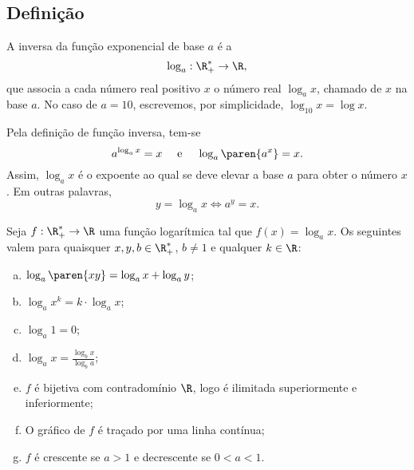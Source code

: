 \subsection{Definição}

\begin{definition}
A inversa da função exponencial de base $a$ é a 
$$\log_a : \R_+^* \to \R,$$
que associa a cada número real positivo $x$ o número real $\log_a
x$, chamado  de $x$ na base $a$. No caso de $a=10$,
escrevemos, por simplicidade, $\log_{10}x = \log x$.
\end{definition}

\begin{remark}
    Pela definição de função inversa, tem-se
$$ a^{\log_a x}=x \ \ \ \text{ e } \ \ \ \log_a \paren{a^x} = x.$$
Assim, $\log_a x $ é o expoente ao qual se deve elevar a base $a$
para obter o número $x$. Em outras palavras,
$$ y = \log_a x \iff a^y = x.$$
\end{remark}

\begin{proposition}
    Seja $f: \R_+^* \to \R$ uma função logarítmica tal que $f(x) =
\log_a x$. Os seguintes valem para quaisquer  $x, y, b \in
\R_+^*$, $b \neq 1$ e qualquer $k \in \R$:
\begin{enumerate}[(a)]
  \item $\log_a \paren{xy} = \log_a x + \log_a y$;
  \item $\log_a x^k = k\cdot \log_a x$;
  \item $\log_a 1 = 0$;
  \item $\log_a x = \frac{\log_b x}{\log_b a}$;
  \item $f$ é bijetiva com contradomínio $\R$, logo é ilimitada superiormente e inferiormente;
  \item O gráfico de $f$ é traçado por uma linha contínua;
  \item $f$ é crescente se $a>1$ e decrescente se $0<a<1$.
\end{enumerate}
\end{proposition}

